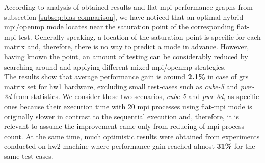


According to analysis of obtained results and flat-\acrshort{mpi} performance graphs from subsection \ref{subseq:blas-comparison}, we have noticed that an optimal hybrid \acrshort{mpi}/\acrshort{openmp} mode locates near the saturation point of the corresponding flat-\acrshort{mpi} test. Generally speaking, a location of the saturation point is specific for each matrix and, therefore, there is no way to predict a mode in advance. However, having known the point, an amount of testing can be considerably reduced by searching around and applying different mixed \acrshort{mpi}/\acrshort{openmp} strategies.\\



The results show that average performance gain is around \textbf{2.1\%} in case of \acrshort{grs} matrix set for \gls{hw1} hardware, excluding small test-cases such as \textit{cube-5} and \textit{pwr-3d} from statistics. We consider these two scenarios, \textit{cube-5} and \textit{pwr-3d}, as specific ones because their execution time with 20 \acrshort{mpi} processes using flat-\acrshort{mpi} mode is originally slower in contrast to the sequential execution and, therefore, it is relevant to assume the improvement came only from reducing of \acrshort{mpi} process count. At the same time, much optimistic results were obtained from experiments conducted on \gls{hw2} machine where performance gain reached almost \textbf{31\%} for the same test-cases.\\



